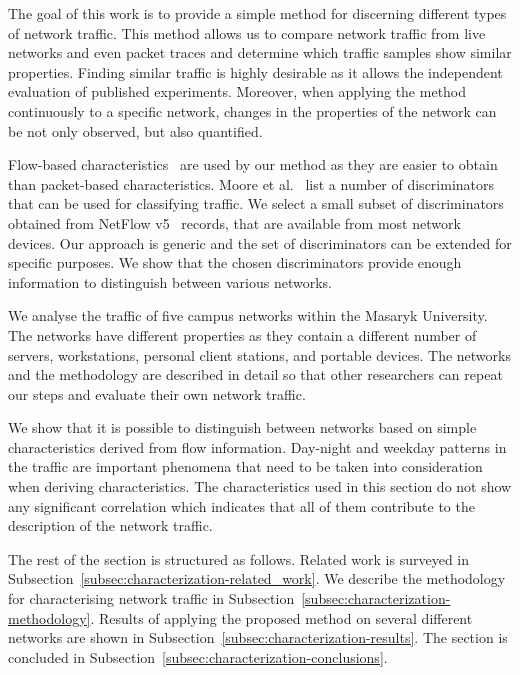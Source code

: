 The goal of this work is to provide a simple method for discerning different types of network traffic. This method allows us to compare network traffic from live networks and even packet traces and determine which traffic samples show similar properties. Finding similar traffic is highly desirable as it allows the independent evaluation of published experiments. Moreover, when applying the method continuously to a specific network, changes in the properties of the network can be not only observed, but also quantified.

Flow-based characteristics~\cite{Hofstede-2014-Flow} are used by our method as they are easier to obtain than packet-based characteristics. Moore et al.~\cite{Moore-2005-Discriminators} list a number of discriminators that can be used for classifying traffic. We select a small subset of discriminators obtained from NetFlow v5~\cite{CiscoSystems-2007-NetFlow} records, that are available from most network devices. Our approach is generic and the set of discriminators can be extended for specific purposes. We show that the chosen discriminators provide enough information to distinguish between various networks.

We analyse the traffic of five campus networks within the Masaryk University. The networks have different properties as they contain a different number of servers, workstations, personal client stations, and portable devices. The networks and the methodology are described in detail so that other researchers can repeat our steps and evaluate their own network traffic.

We show that it is possible to distinguish between networks based on simple characteristics derived from flow information. Day-night and weekday patterns in the traffic are important phenomena that need to be taken into consideration when deriving characteristics. The characteristics used in this section do not show any significant correlation which indicates that all of them contribute to the description of the network traffic.

The rest of the section is structured as follows. Related work is surveyed in Subsection~\ref{subsec:characterization-related_work}. We describe the methodology for characterising network traffic in Subsection~\ref{subsec:characterization-methodology}. Results of applying the proposed method on several different networks are shown in Subsection~\ref{subsec:characterization-results}. The section is concluded in Subsection~\ref{subsec:characterization-conclusions}.


